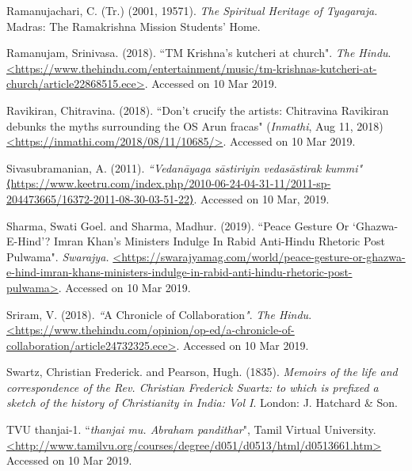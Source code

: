 \begin{thebibliography}{99}
  Ramanujachari, C. (Tr.) (2001, 19571). \textit{The Spiritual Heritage of Tyagaraja. }Madras: The Ramakrishna Mission Students' Home.

  Ramanujam, Srinivasa. (2018). ``TM Krishna's kutcheri at church". \textit{The Hindu}. \url{<https://www.thehindu.com/entertainment/music/tm-krishnas-kutcheri-at-church/article22868515.ece>}. Accessed on 10 Mar 2019.

  Ravikiran, Chitravina. (2018). ``Don't crucify the artists: Chitravina Ravikiran debunks the myths surrounding the OS Arun fracas" (\textit{Inmathi}, Aug 11, 2018) \url{<https://inmathi.com/2018/08/11/10685/>}. Accessed on 10 Mar 2019.

  Sivasubramanian, A. (2011). \textit{``Vedanāyaga sāstiriyin vedasāstirak kummi"} \url{⟨https://www.keetru.com/index.php/2010-06-24-04-31-11/2011-sp-204473665/16372-2011-08-30-03-51-22⟩}. Accessed on 10 Mar, 2019.

  Sharma, Swati Goel. and Sharma, Madhur. (2019). ``Peace Gesture Or `Ghazwa-E-Hind'? Imran Khan's Ministers Indulge In Rabid Anti-Hindu Rhetoric Post Pulwama". \textit{Swarajya.} \url{<https://swarajyamag.com/world/peace-gesture-or-ghazwa-e-hind-imran-khans-ministers-indulge-in-rabid-anti-hindu-rhetoric-post-pulwama>}. Accessed on 10 Mar 2019.

  Sriram, V. (2018). \textit{``}A Chronicle of Collaboration\textit{"}. \textit{The Hindu}. \url{<https://www.thehindu.com/opinion/op-ed/a-chronicle-of-collaboration/article24732325.ece>}. Accessed on 10 Mar 2019.

  Swartz, Christian Frederick. and Pearson, Hugh. (1835). \textit{Memoirs of the life and correspondence of the Rev. Christian Frederick Swartz: to which is prefixed a sketch of the history of Christianity in India: Vol I}. London: J. Hatchard \& Son.

  TVU thanjai-1. ``\textit{thanjai mu. Abraham pandithar}", Tamil Virtual University. \url{<http://www.tamilvu.org/courses/degree/d051/d0513/html/d0513661.htm>} Accessed on 10 Mar 2019.

 \end{thebibliography}

\theendnotes





